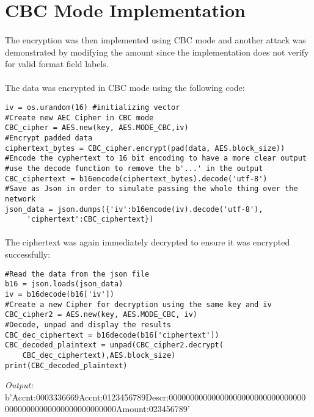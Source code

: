 \section{CBC Mode Implementation}
\paragraph{ }The encryption was then implemented using CBC mode and another attack was demonstrated by modifying the amount since the implementation does not verify for valid format field labels.

\paragraph{ }The data was encrypted in CBC mode using the following code:

\begin{lstlisting}
iv = os.urandom(16) #initializing vector
#Create new AEC Cipher in CBC mode
CBC_cipher = AES.new(key, AES.MODE_CBC,iv) 
#Encrypt padded data
ciphertext_bytes = CBC_cipher.encrypt(pad(data, AES.block_size)) 
#Encode the cyphertext to 16 bit encoding to have a more clear output
#use the decode function to remove the b'...' in the output
CBC_ciphertext = b16encode(ciphertext_bytes).decode('utf-8')
#Save as Json in order to simulate passing the whole thing over the network
json_data = json.dumps({'iv':b16encode(iv).decode('utf-8'),
	 'ciphertext':CBC_ciphertext})
\end{lstlisting}

\paragraph{ }The ciphertext was again immediately decrypted to ensure it was encrypted successfully:

\begin{lstlisting}
#Read the data from the json file
b16 = json.loads(json_data)
iv = b16decode(b16['iv'])
#Create a new Cipher for decryption using the same key and iv
CBC_cipher2 = AES.new(key, AES.MODE_CBC, iv)
#Decode, unpad and display the results
CBC_dec_ciphertext = b16decode(b16['ciphertext'])
CBC_decoded_plaintext = unpad(CBC_cipher2.decrypt(
	CBC_dec_ciphertext),AES.block_size)
print(CBC_decoded_plaintext)
\end{lstlisting}
\textit{Output:} b'Accnt:0003336669Accnt:0123456789Descr:00000000000000000000000000000000\\
00000000000000000000000000Amount:023456789'

